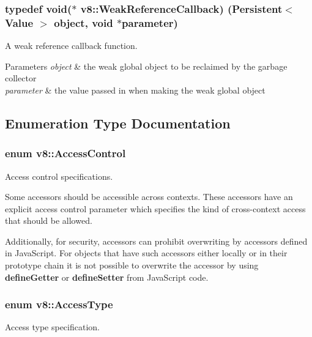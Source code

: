 \subsubsection[{Weak\+Reference\+Callback}]{\setlength{\rightskip}{0pt plus 5cm}typedef void($\ast$ v8\+::\+Weak\+Reference\+Callback) ({\bf Persistent}$<$ {\bf Value} $>$ object, void $\ast$parameter)}\label{namespacev8_a4d5db775dbc002b23f1b55ec7ce80ea5}
A weak reference callback function.


\begin{DoxyParams}{Parameters}
{\em object} & the weak global object to be reclaimed by the garbage collector \\
\hline
{\em parameter} & the value passed in when making the weak global object \\
\hline
\end{DoxyParams}


\subsection{Enumeration Type Documentation}
\hypertarget{namespacev8_a31d8355cb043d7d2dda3f4a52760b64e}{}
\subsubsection[{Access\+Control}]{\setlength{\rightskip}{0pt plus 5cm}enum {\bf v8\+::\+Access\+Control}}\label{namespacev8_a31d8355cb043d7d2dda3f4a52760b64e}
Access control specifications.

Some accessors should be accessible across contexts. These accessors have an explicit access control parameter which specifies the kind of cross-\/context access that should be allowed.

Additionally, for security, accessors can prohibit overwriting by accessors defined in Java\+Script. For objects that have such accessors either locally or in their prototype chain it is not possible to overwrite the accessor by using {\bfseries define\+Getter} or {\bfseries define\+Setter} from Java\+Script code. \hypertarget{namespacev8_add8bef6469c5b94706584124e610046c}{}
\subsubsection[{Access\+Type}]{\setlength{\rightskip}{0pt plus 5cm}enum {\bf v8\+::\+Access\+Type}}\label{namespacev8_add8bef6469c5b94706584124e610046c}
Access type specification. 

